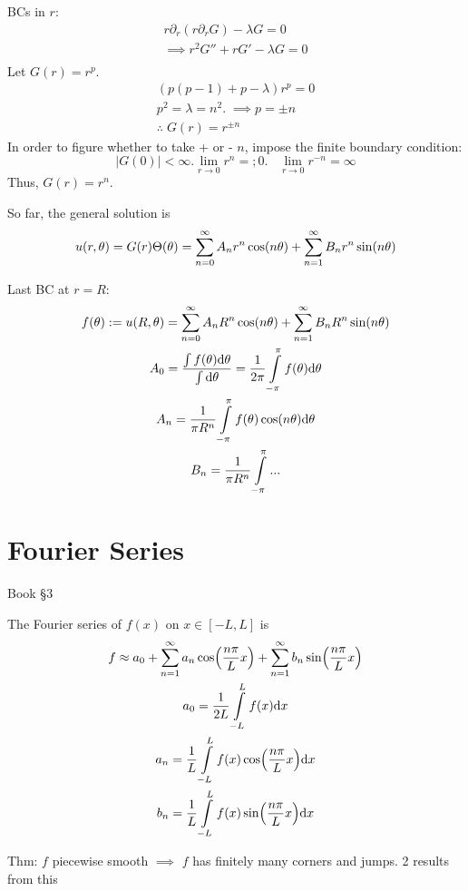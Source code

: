 BCs in $r$: 
\begin{gather*}
	r\partial_r ( r\partial_r G) - \lambda G = 0 \\
	\implies r^2 G'' + rG' - \lambda G = 0 \\
\end{gather*}
Let $G(r) = r^p$. 
\begin{gather*}
	(p(p-1) + p - \lambda) r^p  = 0 \\
	p^2  = \lambda  = n^2. \; \implies p = \pm n \\
	\therefore \; G(r) = r^{\pm n}
\end{gather*}
In order to figure whether to take + or - $n$, impose the finite boundary condition:
\[ |G(0)| < \infty. \lim_{r\to 0} r^n = ; 0. \;\;\; \lim_{r\to 0} r^{-n} = \infty \]
Thus, $G(r) = r^n$.

So far, the general solution is 
\[ u(r, \theta) = G(r) \Theta(\theta) 
	= \sum\limits_{n=0}^\infty A_n r^n \cos(n\theta) 
		+ \sum\limits_{n=1}^\infty B_n r^n \sin(n\theta) \]

Last BC at $r=R$:
\begin{gather*}
	f(\theta) := u(R, \theta) = \sum\limits_{n=0}^\infty A_n R^n \cos (n\theta) + \sum\limits_{n=1}^\infty B_n R^n \sin(n\theta) \\
	A_0 
		= \frac{\int f(\theta) \text{d}\theta}
			{\int\text{d}\theta}  
		=  \frac{1}{2\pi} \int\limits_{-\pi}^\pi f(\theta) \text{d} \theta \\
	A_n 
		= \frac{1}{\pi R^n} \int\limits_{-\pi}^\pi 
			f(\theta) \cos (n\theta) \text{d} \theta \\
	B_n = \frac{1}{\pi R^n} \int\limits_{-\pi}^\pi ...
\end{gather*}

\chapter{Fourier Series}

Book \S 3

The Fourier series of $f(x)$ on $x\in[-L, L]$ is 
\begin{gather*}
	f \approx a_0 + \sum\limits_{n=1}^\infty a_n \cos (\frac{n\pi}{L} x) + \sum\limits_{n=1}^\infty b_n \sin(\frac{n\pi}{L} x) \\
	a_0 = \frac{1}{2L} \int\limits_{-L}^L f(x) \text{d} x \\
	a_n = \frac{1}{L} \int\limits_{-L}^L f(x) \cos (\frac{n\pi}{L} x) \text{d} x \\
	b_n = \frac{1}{L} \int\limits_{-L}^L f(x) \sin(\frac{n\pi}{L} x) \text{d} x
\end{gather*}

Thm: $f$ piecewise smooth $\implies$ $f$ has finitely many corners and jumps. 2 results from this

